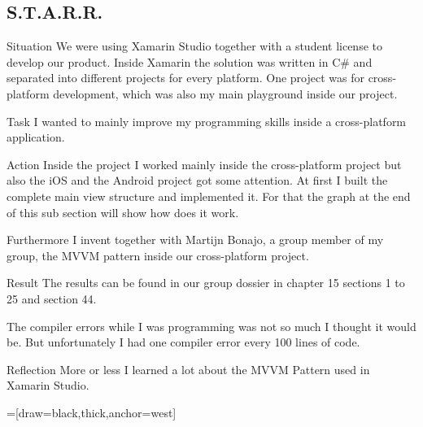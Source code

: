 	\subsection{S.T.A.R.R.}
		\begin{STARR}
			\item[Situation] We were using Xamarin Studio together with a student license to develop our product. Inside Xamarin the solution was written in C\# and separated into different projects for every platform. One project was for cross-platform development, which was also my main playground inside our project.
			\item[Task] I wanted to mainly improve my programming skills inside a cross-platform application.
			\item[Action] Inside the project I worked mainly inside the cross-platform project but also the iOS and the Android project got some attention. At first I built the complete main view structure and implemented it. For that the graph at the end of this sub section will show how does it work.

				Furthermore I invent together with Martijn Bonajo, a group member of my group, the MVVM pattern inside our cross-platform project.
				
			\item[Result] The results can be found in our group dossier in chapter 15 sections 1 to 25 and section 44.
			
				The compiler errors while I was programming was not so much I thought it would be. But unfortunately I had one compiler error every 100 lines of code.
			\item[Reflection] More or less I learned a lot about the MVVM Pattern used in Xamarin Studio.
		\end{STARR}
		
		\hspace*{4cm}
		\begin{turn}{90}
			\usetikzlibrary{trees}
			=[draw=black,thick,anchor=west]
		\end{turn}